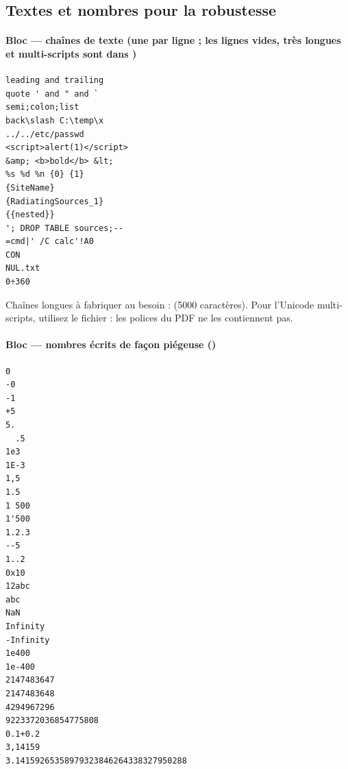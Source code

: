 \subsection{Textes et nombres pour la robustesse}\label{sec:blocsF}
\paragraph*{Bloc  --- chaînes de texte (une par ligne ; les lignes vides, très longues et multi-scripts sont dans )}\vspace{-2pt}
\begin{Verbatim}[frame=single,framesep=1.5mm,fontsize=\footnotesize,rulecolor=\color{accent}]
   leading and trailing   
quote ' and " and `
semi;colon;list
back\slash C:\temp\x
../../etc/passwd
<script>alert(1)</script>
&amp; <b>bold</b> &lt;
%s %d %n {0} {1}
{SiteName}
{RadiatingSources_1}
{{nested}}
'; DROP TABLE sources;--
=cmd|' /C calc'!A0
CON
NUL.txt
0÷360
\end{Verbatim}
Chaînes longues à fabriquer au besoin :  (5000 caractères). Pour l'Unicode multi-scripts, utilisez le fichier : les polices du PDF ne les contiennent pas.
\paragraph*{Bloc  --- nombres écrits de façon piégeuse ()}\vspace{-2pt}
\begin{Verbatim}[frame=single,framesep=1.5mm,fontsize=\footnotesize,rulecolor=\color{accent}]
0
-0
-1
+5
5.
  .5
1e3
1E-3
1,5
1.5
1 500
1'500
1.2.3
--5
1..2
0x10
12abc
abc
NaN
Infinity
-Infinity
1e400
1e-400
2147483647
2147483648
4294967296
9223372036854775808
0.1+0.2
3,14159
3.14159265358979323846264338327950288
\end{Verbatim}
